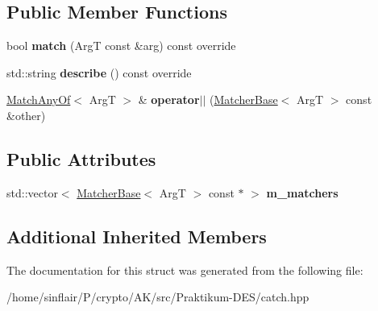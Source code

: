 \subsection*{Public Member Functions}
\begin{DoxyCompactItemize}
\item 
\mbox{\label{structCatch_1_1Matchers_1_1Impl_1_1MatchAnyOf_a8a3e8338f979e56277dcf553efb78dc0}} 
bool {\bfseries match} (ArgT const \&arg) const override
\item 
\mbox{\label{structCatch_1_1Matchers_1_1Impl_1_1MatchAnyOf_a315285204df93d1f8e72f50dd66eb709}} 
std\+::string {\bfseries describe} () const override
\item 
\mbox{\label{structCatch_1_1Matchers_1_1Impl_1_1MatchAnyOf_a44d7582dbe09fc31b9a5ba8a6367b506}} 
\hyperlink{structCatch_1_1Matchers_1_1Impl_1_1MatchAnyOf}{Match\+Any\+Of}$<$ ArgT $>$ \& {\bfseries operator$\vert$$\vert$} (\hyperlink{structCatch_1_1Matchers_1_1Impl_1_1MatcherBase}{Matcher\+Base}$<$ ArgT $>$ const \&other)
\end{DoxyCompactItemize}
\subsection*{Public Attributes}
\begin{DoxyCompactItemize}
\item 
\mbox{\label{structCatch_1_1Matchers_1_1Impl_1_1MatchAnyOf_a1fb1119e6110dc15b8d5262ec0aeddd5}} 
std\+::vector$<$ \hyperlink{structCatch_1_1Matchers_1_1Impl_1_1MatcherBase}{Matcher\+Base}$<$ ArgT $>$ const  $\ast$ $>$ {\bfseries m\+\_\+matchers}
\end{DoxyCompactItemize}
\subsection*{Additional Inherited Members}


The documentation for this struct was generated from the following file\+:\begin{DoxyCompactItemize}
\item 
/home/sinflair/\+P/crypto/\+A\+K/src/\+Praktikum-\/\+D\+E\+S/catch.\+hpp\end{DoxyCompactItemize}
